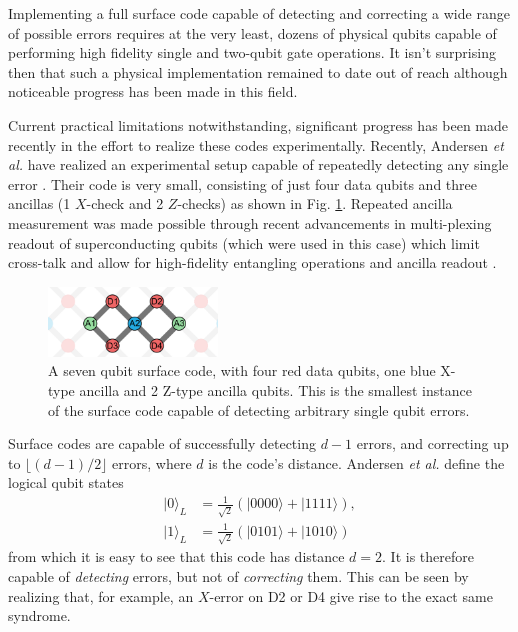 Implementing a full surface code capable of detecting and correcting a wide
range of possible errors requires at the very least, dozens of physical qubits
capable of performing high fidelity single and two-qubit gate operations. It
isn't surprising then that such a physical implementation remained to date out
of reach although noticeable progress has been made in this field.

Current practical limitations notwithstanding, significant progress has been
made recently in the effort to realize these codes experimentally. Recently,
Andersen \textit{et al.} have realized an experimental setup capable of
repeatedly detecting any single error \cite{Andersen_2020}. Their code is very
small, consisting of just four data qubits and three ancillas (1 $X$-check and 2
$Z$-checks) as shown in Fig. \ref{fig:seven_qbit_code}. Repeated ancilla
measurement was made possible through recent advancements in multi-plexing
readout of superconducting qubits (which were used in this case) which limit
cross-talk and allow for high-fidelity entangling operations and ancilla readout
\cite{barends14_super_quant_circuit_at_surfac} \cite{Bultink_2020}.

\begin{figure}[h]
  \centering
  \includegraphics[width=0.4\textwidth]{images/seven_qbit_code.pdf}
  \caption{A seven qubit surface code, with four red data qubits, one blue
    X-type ancilla and 2 Z-type ancilla qubits. This is the smallest instance of
    the surface code capable of detecting arbitrary single qubit errors.}
  \label{fig:seven_qbit_code}
\end{figure}

Surface codes are capable of successfully detecting $d-1$ errors, and correcting
up to $\lfloor{(d-1)/2} \rfloor$ errors, where $d$ is the code's distance.
Andersen \textit{et al.} define the logical qubit states
\begin{align}
|0\rangle_L &= \frac{1}{\sqrt{2}} (|0000\rangle + |1111\rangle) , \\
|1\rangle_L &= \frac{1}{\sqrt{2}} (|0101\rangle + |1010\rangle) 
\end{align}
from which it is easy to see that this code has distance $d=2$. It is therefore
capable of \textit{detecting} errors, but not of \textit{correcting} them. This
can be seen by realizing that, for example, an $X$-error on D2 or D4 give rise
to the exact same syndrome.

